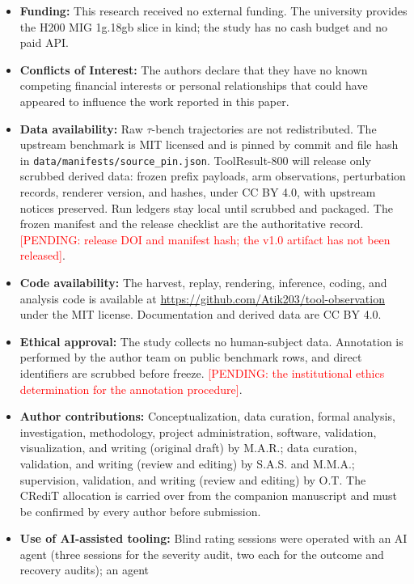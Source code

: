 \documentclass[a4paper,fleqn]{cas-sc}
\newcommand{\pending}[1]{\textcolor{red}{[PENDING: #1]}}
\begin{document}
\begin{itemize}
  \setlength{\itemsep}{0pt}
  \setlength{\parsep}{0pt}
  \item \textbf{Funding:} This research received no external funding. The university provides the
  H200 MIG 1g.18gb slice in kind; the study has no cash budget and no paid API.   \item \textbf{Conflicts of Interest:} The authors declare that they have no known competing
  financial interests or personal relationships that could have appeared to influence the work
  reported in this paper.   \item \textbf{Data availability:} Raw $\tau$-bench trajectories are not redistributed. The
  upstream benchmark is MIT licensed and is pinned by commit and file hash in
  \texttt{data/manifests/source\_pin.json}. ToolResult-800 will release only scrubbed derived
  data: frozen prefix payloads, arm observations, perturbation records, renderer version, and
  hashes, under CC BY 4.0, with upstream notices preserved. Run ledgers stay local until scrubbed and
  packaged. The frozen manifest and the release checklist are the authoritative record.
  \pending{release DOI and manifest hash; the v1.0 artifact has not been released}.   \item \textbf{Code availability:} The harvest, replay, rendering, inference, coding, and
  analysis code is available at \url{https://github.com/Atik203/tool-observation} under the MIT
  license. Documentation and derived data are CC BY 4.0.   \item \textbf{Ethical approval:} The study collects no human-subject data. Annotation is
  performed by the author team on public benchmark rows, and direct identifiers are scrubbed
  before freeze. \pending{the institutional ethics determination for the annotation procedure}.   \item \textbf{Author contributions:} Conceptualization, data curation, formal analysis,
  investigation, methodology, project administration, software, validation, visualization, and
  writing (original draft) by M.A.R.; data curation, validation, and writing (review and editing)
  by S.A.S. and M.M.A.; supervision, validation, and writing (review and editing) by O.T. The
  CRediT allocation is carried over from the companion manuscript and must be confirmed by every
  author before submission.   \item \textbf{Use of AI-assisted tooling:} Blind rating sessions were operated with an AI agent
  (three sessions for the severity audit, two each for the outcome and recovery audits); an agent

\end{itemize}
\end{document}
